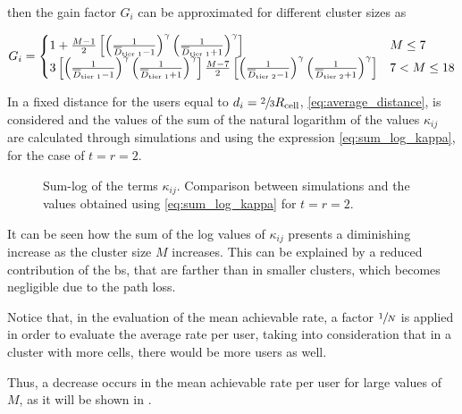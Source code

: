 \noindent
then the gain factor $G_i$ can be approximated for different cluster sizes as

\begin{equation} \label{eq:cluster_gain_value}
    G_i = \begin{cases}
    1 + \frac{M - 1}{2}\left[ \left( \frac{1}{\overline{D}_{\text{tier 1}} - 1}\right)^{\gamma}
    \left( \frac{1}{\overline{D}_{\text{tier 1}} + 1}\right)^{\gamma} \right]
    & M \leq 7 \\
    3 \left[ \left( \frac{1}{\overline{D}_{\text{tier 1}} - 1}\right)^{\gamma}
    \left( \frac{1}{\overline{D}_{\text{tier 1}} + 1}\right)^{\gamma} \right]
    \frac{M - 7}{2} \left[ \left( \frac{1}{\overline{D}_{\text{tier 2}} - 1}\right)^{\gamma}
    \left( \frac{1}{\overline{D}_{\text{tier 2}} + 1}\right)^{\gamma} \right]
    & 7 < M \leq 18
    \end{cases}
\end{equation}

In  a fixed distance for the users equal to $d_{i} =
\sfrac{2}{3}R_{\text{cell}}$, \eqref{eq:average_distance}, is considered and the values
of the sum of the natural logarithm of the values $\kappa_{ij}$ are calculated
through simulations and using the expression \eqref{eq:sum_log_kappa}, for the
case of $t = r = 2$.

\begin{figure}[t]
\begin{center}
    \hspace*{1mm}
\end{center}
\caption{Sum-log of the terms $\kappa_{ij}$. Comparison between simulations and
the values obtained using \eqref{eq:sum_log_kappa} for $ t = r = 2$.}
\label{fig:sum_log_kappa}
\end{figure}

It can be seen how the sum of the log values of $\kappa_{ij}$ presents a
diminishing increase as the cluster size $M$ increases. This can be explained by
a reduced contribution of the \gls{bs}, that are farther than in smaller
clusters, which becomes negligible due to the path loss.

Notice that, in the evaluation of the mean achievable rate, a factor
$\sfrac{1}{N}$ is applied in order to evaluate the average rate per user, taking
into consideration that in a cluster with more cells, there would be more users
as well.

Thus, a decrease occurs in the mean achievable rate per user for large values of
$M$, as it will be shown in .


